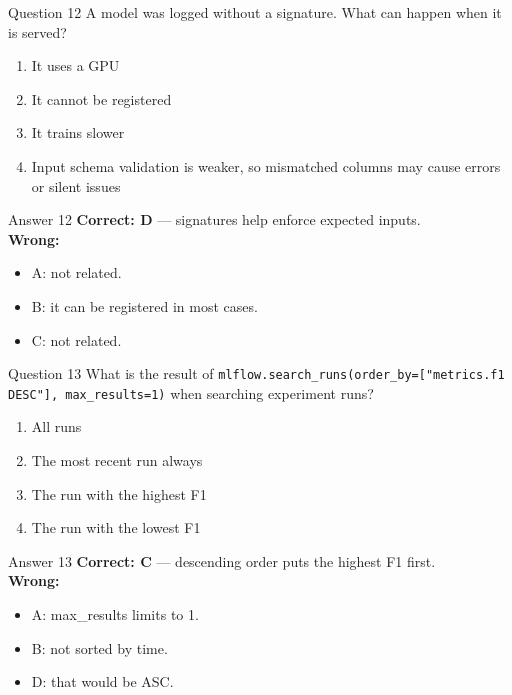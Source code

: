 \documentclass[aspectratio=169,11pt]{beamer}
\begin{document}
\begin{frame}{Question 12}
A model was logged without a signature. What can happen when it is served?
\begin{enumerate}[label=\Alph*.]
\item It uses a GPU
\item It cannot be registered
\item It trains slower
\item Input schema validation is weaker, so mismatched columns may cause errors or silent issues
\end{enumerate}
\end{frame}
\begin{frame}{Answer 12}
\textbf{Correct: D} --- signatures help enforce expected inputs.\\
\vspace{0.5em}
\textbf{Wrong:}
\begin{itemize}
\item A: not related.
\item B: it can be registered in most cases.
\item C: not related.
\end{itemize}
\end{frame}

\begin{frame}{Question 13}
What is the result of \texttt{mlflow.search\_runs(order\_by=["metrics.f1 DESC"], max\_results=1)} when searching experiment runs?
\begin{enumerate}[label=\Alph*.]
\item All runs
\item The most recent run always
\item The run with the highest F1
\item The run with the lowest F1
\end{enumerate}
\end{frame}
\begin{frame}{Answer 13}
\textbf{Correct: C} --- descending order puts the highest F1 first.\\
\vspace{0.5em}
\textbf{Wrong:}
\begin{itemize}
\item A: max\_results limits to 1.
\item B: not sorted by time.
\item D: that would be ASC.
\end{itemize}
\end{frame}
\end{document}
